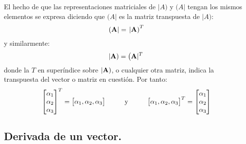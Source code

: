\documentclass[12pt]{article}
\begin{document}
\par
El hecho de que las representaciones matriciales de $| A)$ y $(A |$ tengan los mismos elementos se expresa diciendo que $(A |$ es la matriz transpuesta de $| A)$:
\begin{align}
    ( \vb{A} | = \left. | \vb{A} \right)^{T}
    \label{eq:ecuacion_01_54}
\end{align} 
y similarmente:
\begin{align*}
    | \vb{A} ) = \left( \vb{A} |^{T} \right.
\end{align*}
donde la $T$ en superíndice sobre $| \vb{A} )$, o cualquier otra matriz, indica la transpuesta del vector o matriz en cuestión. Por tanto:
\begin{align}
    \mqty[ \alpha_{1} \\ \alpha_{2} \\ \alpha_{3} ]^{T} = \mqty[ \alpha_{1} , \alpha_{2} , \alpha_{3} ] \hspace{1cm} \text{y} \hspace{1cm} \mqty[ \alpha_{1}, \alpha_{2}, \alpha_{3} ]^{T} = \mqty[ \alpha_{1} \\ \alpha_{2} \\ \alpha_{3} ]
    \label{eq:ecuacion_01_55}
\end{align}

\subsection{Derivada de un vector.}
\end{document}
